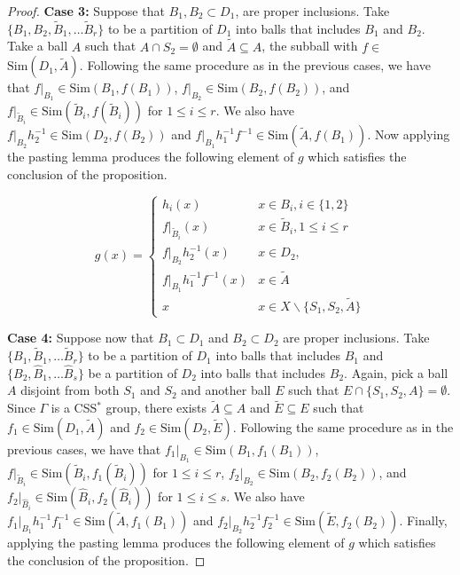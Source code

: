 \documentclass[12pt]{amsart}
\numberwithin{equation}{subsection}
\theoremstyle{definition}
\theoremstyle{definition}
\theoremstyle{remark}
\begin{document}
\begin{proof}
    \noindent\textbf{Case 3:} 
    Suppose that $B_1, B_2 \subset D_1$, are proper inclusions. Take $\{B_1, B_2, \tilde B_1, \dots \tilde B_r \}$ to be a partition of $D_1$ into balls that includes $B_1$ and $B_2$. Take a ball $A$ such that $A \cap S_2 =\emptyset$ and $\tilde A \subseteq A$, the subball with $f \in$ $\text{Sim}(D_1, \tilde A)$. Following the same procedure as in the previous cases, we have that $f\vert_{B_1} \in \text{Sim}(B_1, f(B_1))$, $f\vert_{B_2} \in \text{Sim}(B_2, f(B_2))$, and $f\vert_{\tilde B_i} \in \text{Sim}(\tilde B_i, f(\tilde B_i))$ for $1 \leq i \leq r$. We also have $f\vert_{B_2}h_2^{-1} \in \text{Sim}(D_2,f(B_2))$ and $f\vert_{B_1}h_1^{-1}f^{-1} \in \text{Sim}(\tilde A, f(B_1))$. Now applying the pasting lemma produces the following element of $g$ which satisfies the conclusion of the proposition.  

    
     \[ g(x) = \begin{cases} h_i(x) & x \in B_i, i\in\{1,2\}  \\
     f\vert_{\tilde B_i}(x) & x \in \tilde B_i, 1\leq i \leq r\\
    f\vert_{B_2}h_2^{-1}(x) & x \in D_2, \\
    f\vert_{B_1}h_1^{-1}f^{-1} (x) & x\in \tilde A\\
    x & x \in X \backslash \{S_1, S_2, \tilde A\}
    \end{cases}
    \]



    \noindent\textbf{Case 4:}
    Suppose now that $B_1 \subset D_1$ and $B_2 \subset D_2$ are proper inclusions. Take $\{B_1, \tilde B_1, \dots \tilde B_r \}$ to be a partition of $D_1$ into balls that includes $B_1$ and $\{B_2, \hat B_1, \dots \hat B_s \}$ be a partition of $D_2$ into balls that includes $B_2$. Again, pick a ball $A$ disjoint from both $S_1$ and $S_2$ and another ball $E$ such that $E \cap \{S_1, S_2, A\} = \emptyset$. Since $\Gamma$ is a CSS$^*$ group, there exists $\tilde A \subseteq A$ and $\tilde E \subseteq E$ such that $f_1 \in \text{Sim}(D_1, \tilde A)$ and $f_2 \in \text{Sim}(D_2, \tilde E)$. Following the same procedure as in the previous cases, we have that $f_1\vert_{B_1} \in \text{Sim}(B_1, f_1(B_1))$,  $f\vert_{\tilde B_i} \in \text{Sim}(\tilde B_i, f_1(\tilde B_i))$ for $1 \leq i \leq r$, $f_2\vert_{B_2} \in \text{Sim}(B_2, f_2(B_2))$, and $f_2\vert_{\hat B_i} \in \text{Sim}(\hat B_i, f_2(\hat B_i))$ for $1 \leq i \leq s$.  We also have $f_1\vert_{B_1}h_1^{-1}f_1^{-1} \in \text{Sim}(\tilde A,f_1(B_1))$ and $f_2\vert_{B_2}h_2^{-1}f_2^{-1} \in \text{Sim}(\tilde E, f_2(B_2))$. Finally, applying the pasting lemma produces the following element of $g$ which satisfies the conclusion of the proposition.  


\end{proof}
\end{document}
